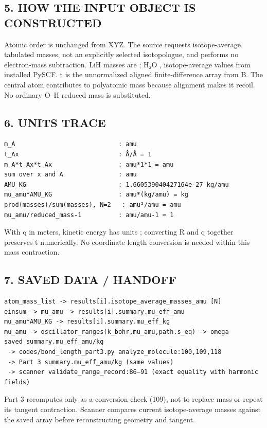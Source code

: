 \documentclass[10pt,a4paper]{article}
\begin{document}
\subsection{5. HOW THE INPUT OBJECT IS CONSTRUCTED}
Atomic order is unchanged from XYZ. The source requests isotope-average tabulated masses, not an explicitly selected isotopologue, and performs no electron-mass subtraction. LiH masses are ; H₂O , isotope-average values from installed PySCF. t is the unnormalized aligned finite-difference array from B. The central atom contributes to polyatomic mass because alignment makes it recoil. No ordinary O–H reduced mass is substituted.

\subsection{6. UNITS TRACE}
\begin{Verbatim}
m_A                            : amu
t_Ax                           : Å/Å = 1
m_A*t_Ax*t_Ax                  : amu*1*1 = amu
sum over x and A               : amu
AMU_KG                         : 1.660539040427164e-27 kg/amu
mu_amu*AMU_KG                  : amu*(kg/amu) = kg
prod(masses)/sum(masses), N=2   : amu²/amu = amu
mu_amu/reduced_mass-1          : amu/amu-1 = 1
\end{Verbatim}
With q in meters, kinetic energy has units ; converting R and q together preserves t numerically. No coordinate length conversion is needed within this mass contraction.

\subsection{7. SAVED DATA / HANDOFF}
\begin{Verbatim}
atom_mass_list -> results[i].isotope_average_masses_amu [N]
einsum -> mu_amu -> results[i].summary.mu_eff_amu
mu_amu*AMU_KG -> results[i].summary.mu_eff_kg
mu_amu -> oscillator_ranges(k_bohr,mu_amu,path.s_eq) -> omega
saved summary.mu_eff_amu/kg
 -> codes/bond_length_part3.py analyze_molecule:100,109,118
 -> Part 3 summary.mu_eff_amu/kg (same values)
 -> scanner validate_range_record:86–91 (exact equality with harmonic fields)
\end{Verbatim}
Part 3 recomputes  only as a conversion check (109), not to replace mass or repeat its tangent contraction. Scanner  compares current isotope-average masses against the saved array before reconstructing geometry and tangent.
\end{document}
